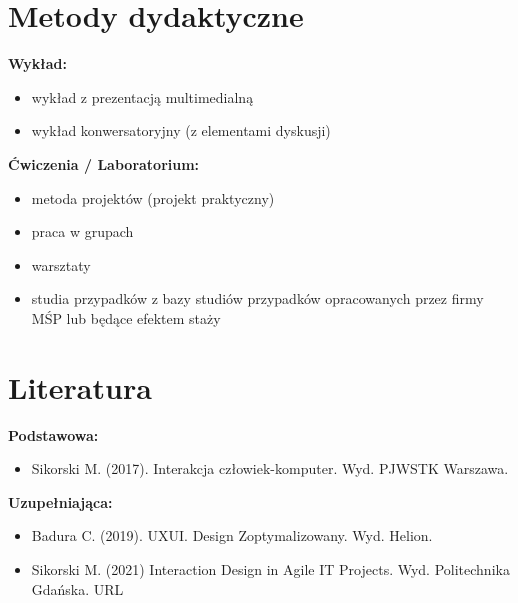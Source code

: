 \documentclass[12pt, a4paper]{article}
\begin{document}
\section{Metody dydaktyczne}

\textbf{Wykład:}
\begin{itemize}
  \item wykład z prezentacją multimedialną
  \item wykład konwersatoryjny (z elementami dyskusji)
\end{itemize}
\vspace{4pt}
\textbf{Ćwiczenia / Laboratorium:}
\begin{itemize}
  \item metoda projektów (projekt praktyczny)
  \item praca w grupach
  \item warsztaty
  \item studia przypadków z bazy studiów przypadków opracowanych przez firmy MŚP lub będące efektem staży
\end{itemize}
\vspace{4pt}


\section{Literatura}

\textbf{Podstawowa:}
\begin{itemize}
  \item Sikorski M. (2017). Interakcja człowiek-komputer. Wyd. PJWSTK Warszawa.
\end{itemize}

\textbf{Uzupełniająca:}
\begin{itemize}
  \item Badura C. (2019). UXUI. Design Zoptymalizowany. Wyd. Helion.
  \item Sikorski  M. (2021) Interaction Design in Agile IT Projects. Wyd. Politechnika Gdańska.  URL
\end{itemize}
\end{document}
